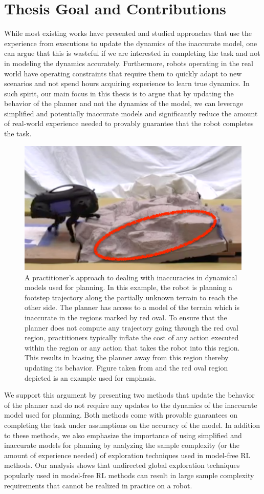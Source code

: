 \section{Thesis Goal and Contributions}
\label{sec:thes-goal-contr}

While most existing works have presented and studied approaches that
use the experience from executions to update the dynamics of the
inaccurate model, one can argue that this is wasteful if we are interested in
completing the task and not in modeling the dynamics
accurately. Furthermore, robots operating in the real world have
operating constraints that require them to quickly adapt to
new scenarios and not spend hours acquiring experience to learn true
dynamics. In such spirit, our main focus in this thesis is to argue that by updating the
behavior of the planner and not the dynamics of the model, we can
leverage simplified and potentially inaccurate models and
significantly reduce the amount of real-world experience needed to
provably guarantee that the robot completes the task.

\begin{figure}[t]
  \centering
  \includegraphics[width=0.5\linewidth]{Figures/intro/zucker}
  \caption{A practitioner's approach to dealing with inaccuracies in
    dynamical models used for planning. In this example, the robot is
    planning a footstep trajectory along the partially unknown terrain
  to reach the other side. The planner has access to a model of the
  terrain which is inaccurate in the regions marked by red oval. To
  ensure that the planner does not compute any trajectory going
  through the red oval region, practitioners typically inflate the
  cost of any action executed within the region or any action that
  takes the robot into this region. This results in biasing the
  planner away from this region thereby updating its behavior. Figure
  taken from \cite{DBLP:journals/ijrr/ZuckerRSCBAK11} and the red oval
  region depicted is an example used for emphasis.}
\label{fig:zucker}
\end{figure}

We support this argument by presenting two methods that update the
behavior of the planner and do not require any updates to the dynamics
of the inaccurate model used for planning.  Both methods come with
provable guarantees on completing the task under assumptions on the
accuracy of the model. In addition to these methods, we also emphasize
the importance of using simplified and inaccurate models for planning
by analyzing the sample complexity (or the amount of experience
needed) of exploration techniques used in model-free RL methods. Our
analysis shows that undirected global exploration techniques popularly
used in model-free RL methods can result in large sample complexity
requirements that cannot be realized in practice on a robot.

